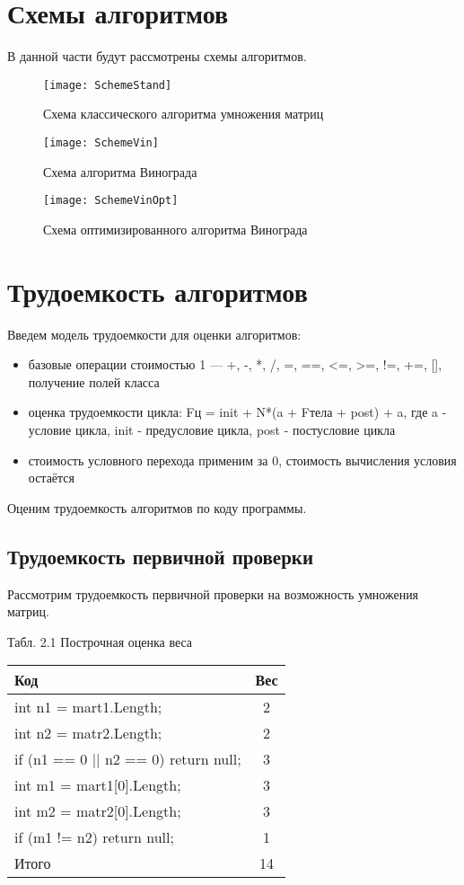 \documentclass[12pt]{report}
\begin{document}
\section{Схемы алгоритмов}
В данной части будут рассмотрены схемы алгоритмов.

\begin{figure}[!htbp]
\centering
\texttt{[image: SchemeStand]}
\caption{Схема классического алгоритма умножения матриц}
\label{fig:mpr}
\end{figure}

\begin{figure}[!htbp]
\centering
\texttt{[image: SchemeVin]}
\caption{Схема алгоритма Винограда}
\label{fig:mpr}
\end{figure}


\begin{figure}[!htbp]
\centering
\texttt{[image: SchemeVinOpt]}
\caption{Схема оптимизированного алгоритма Винограда}
\label{fig:mpr}
\end{figure}

\newpage
\section{Трудоемкость алгоритмов}
Введем модель трудоемкости для оценки алгоритмов: 
\begin{itemize}
	\item базовые операции стоимостью 1 — +, -, *, /, =, ==, <=, >=, !=, +=, [], получение полей класса
	\item оценка трудоемкости цикла: Fц = init +  N*(a + Fтела + post) + a, где a - условие цикла, init - предусловие цикла, post - постусловие цикла
	\item стоимость условного перехода применим за 0, стоимость вычисления условия остаётся
\end{itemize}

Оценим трудоемкость алгоритмов по коду программы.

\subsection{Трудоемкость первичной проверки}
Рассмотрим трудоемкость первичной проверки на возможность умножения матриц.

\begin{center}
Табл. 2.1 Построчная оценка веса
	\begin{tabular}{|l c|} 
 	\hline
	Код & Вес \\ [0.5ex] 
 	\hline\hline
 	 int n1 = mart1.Length; & 2\\
 	\hline
	int n2 = matr2.Length; & 2\\
	\hline
	 if (n1  == 0 || n2 == 0) return null; & 3\\
	\hline
	int m1 = mart1[0].Length; & 3\\
	\hline
	int m2 = matr2[0].Length; & 3\\
	\hline
	if (m1 != n2) return null; & 1\\
	\hline\hline
	Итого & 14\\
	\hline
	\end{tabular}
\end{center}
\end{document}
